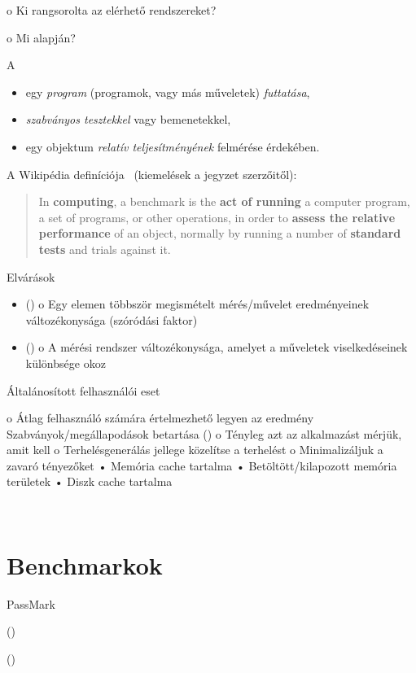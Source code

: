 o Ki rangsorolta az elérhető rendszereket?

o Mi alapján?

\begin{definicio}
	A 
	\begin{itemize}
		\item egy \emph{program} (programok, vagy más műveletek) \emph{futtatása},
		\item \emph{szabványos tesztekkel} vagy bemenetekkel,
		\item egy objektum \emph{relatív teljesítményének} felmérése érdekében.
	\end{itemize}
\end{definicio}

A Wikipédia definíciója~\cite{wiki:benchmark} (kiemelések a jegyzet szerzőitől):

\begin{quote}
	In \textbf{computing}, a benchmark is the \textbf{act of running} a computer program, a set of programs, or other operations, in order to \textbf{assess the relative performance} of an object, normally by running a number of \textbf{standard tests} and trials against it.
\end{quote}

Elvárások

\begin{itemize}
	\item {} ()
	o Egy elemen többször megismételt mérés/művelet eredményeinek változékonysága (szóródási faktor)
	\item {} ()
	o A mérési rendszer változékonysága, amelyet a műveletek viselkedéseinek különbsége okoz
\end{itemize}

Általánosított felhasználói eset

o Átlag felhasználó számára értelmezhető legyen az
eredmény
Szabványok/megállapodások betartása
 ()
o Tényleg azt az alkalmazást mérjük, amit kell
o Terhelésgenerálás jellege közelítse a  terhelést
o Minimalizáljuk a zavaró tényezőket
• Memória cache tartalma
• Betöltött/kilapozott memória területek
• Diszk cache tartalma

~\cite{DBLP:books/mk/Gray93}


\section{Benchmarkok\kieg}

PassMark

 ()

 ()

